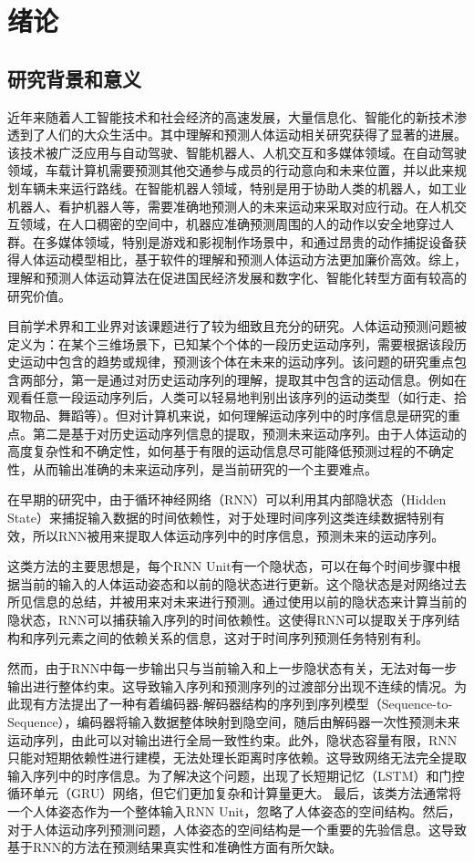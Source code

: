 \chapter{绪论}
%
\section{研究背景和意义}
\label{section:1.1}
近年来随着人工智能技术和社会经济的高速发展，大量信息化、智能化的新技术渗透到了人们的大众生活中。其中理解和预测人体运动相关研究获得了显著的进展。该技术被广泛应用与自动驾驶、智能机器人、人机交互和多媒体领域。在自动驾驶领域，车载计算机需要预测其他交通参与成员的行动意向和未来位置，并以此来规划车辆未来运行路线。在智能机器人领域，特别是用于协助人类的机器人，如工业机器人、看护机器人等，需要准确地预测人的未来运动来采取对应行动。在人机交互领域，在人口稠密的空间中，机器应准确预测周围的人的动作以安全地穿过人群。在多媒体领域，特别是游戏和影视制作场景中，和通过昂贵的动作捕捉设备获得人体运动模型相比，基于软件的理解和预测人体运动方法更加廉价高效。综上，理解和预测人体运动算法在促进国民经济发展和数字化、智能化转型方面有较高的研究价值。

目前学术界和工业界对该课题进行了较为细致且充分的研究。人体运动预测问题被定义为：在某个三维场景下，已知某个个体的一段历史运动序列，需要根据该段历史运动中包含的趋势或规律，预测该个体在未来的运动序列。该问题的研究重点包含两部分，第一是通过对历史运动序列的理解，提取其中包含的运动信息。例如在观看任意一段运动序列后，人类可以轻易地判别出该序列的运动类型（如行走、拾取物品、舞蹈等）。但对计算机来说，如何理解运动序列中的时序信息是研究的重点。第二是基于对历史运动序列信息的提取，预测未来运动序列。由于人体运动的高度复杂性和不确定性，如何基于有限的运动信息尽可能降低预测过程的不确定性，从而输出准确的未来运动序列，是当前研究的一个主要难点。

在早期的研究中，由于循环神经网络（RNN\cite{zaremba2014recurrent}）可以利用其内部隐状态（Hidden State）来捕捉输入数据的时间依赖性，对于处理时间序列这类连续数据特别有效，所以RNN被用来提取人体运动序列中的时序信息，预测未来的运动序列。

这类方法的主要思想是，每个RNN Unit有一个隐状态，可以在每个时间步骤中根据当前的输入的人体运动姿态和以前的隐状态进行更新。这个隐状态是对网络过去所见信息的总结，并被用来对未来进行预测。通过使用以前的隐状态来计算当前的隐状态，RNN可以捕获输入序列的时间依赖性。这使得RNN可以提取关于序列结构和序列元素之间的依赖关系的信息，这对于时间序列预测任务特别有利。

然而，由于RNN中每一步输出只与当前输入和上一步隐状态有关，无法对每一步输出进行整体约束。这导致输入序列和预测序列的过渡部分出现不连续的情况。为此现有方法提出了一种有着编码器-解码器结构的序列到序列模型（Sequence-to-Sequence），编码器将输入数据整体映射到隐空间，随后由解码器一次性预测未来运动序列，由此可以对输出进行全局一致性约束。此外，隐状态容量有限，RNN只能对短期依赖性进行建模，无法处理长距离时序依赖。这导致网络无法完全提取输入序列中的时序信息。为了解决这个问题，出现了长短期记忆（LSTM\cite{shi2015convolutional}）和门控循环单元（GRU\cite{cho2014learning}）网络，但它们更加复杂和计算量更大。
最后，该类方法通常将一个人体姿态作为一个整体输入RNN Unit，忽略了人体姿态的空间结构。然后，对于人体运动序列预测问题，人体姿态的空间结构是一个重要的先验信息。这导致基于RNN的方法在预测结果真实性和准确性方面有所欠缺。

